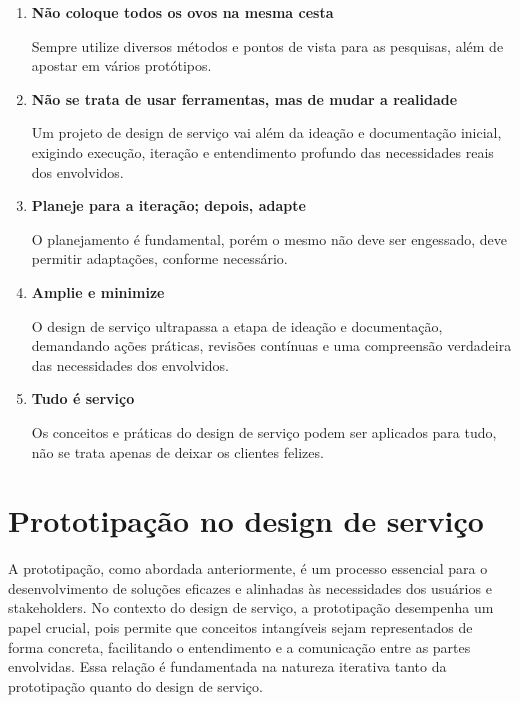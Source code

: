 \begin{enumerate}
	\item \textbf{Não coloque todos os ovos na mesma cesta}
	
	Sempre utilize diversos métodos e pontos de vista para as pesquisas, além de apostar em vários protótipos.
	
	\item \textbf{Não se trata de usar ferramentas, mas de mudar a realidade}
	
	Um projeto de design de serviço vai além da ideação e documentação inicial, exigindo execução, iteração e entendimento profundo das necessidades reais dos envolvidos.
	
	\item \textbf{Planeje para a iteração; depois, adapte}
	
	O planejamento é fundamental, porém o mesmo não deve ser engessado, deve permitir adaptações, conforme necessário.
	
	\item \textbf{Amplie e minimize}
	
	O design de serviço ultrapassa a etapa de ideação e documentação, demandando ações práticas, revisões contínuas e uma compreensão verdadeira das necessidades dos envolvidos.
	
	\item \textbf{Tudo é serviço}
	
	Os conceitos e práticas do design de serviço podem ser aplicados para tudo, não se trata apenas de deixar os clientes felizes.
	
\end{enumerate}

\section{Prototipação no design de serviço}

A prototipação, como abordada anteriormente, é um processo essencial para o desenvolvimento de soluções eficazes e alinhadas às necessidades dos usuários e stakeholders. No contexto do design de serviço, a prototipação desempenha um papel crucial, pois permite que conceitos intangíveis sejam representados de forma concreta, facilitando o entendimento e a comunicação entre as partes envolvidas. Essa relação é fundamentada na natureza iterativa tanto da prototipação quanto do design de serviço.


